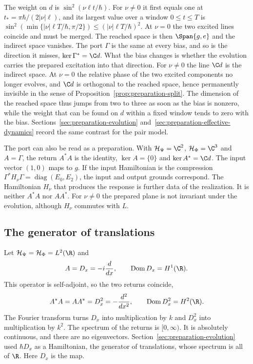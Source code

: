 The weight on $d$ is $\sin^2(\nu\ell t/\hbar)$. For $\nu\ne0$ it first equals one at $t_*=\pi\hbar/(2|\nu|\ell)$, and its largest value over a window $0\le t\le T$ is $\sin^2(\min\{|\nu|\ell T/\hbar,\pi/2\})\le(|\nu|\ell T/\hbar)^2$. At $\nu=0$ the two excited lines coincide and must be merged. The reached space is then $\Span\{g,e\}$ and the indirect space vanishes. The port $\Gamma$ is the same at every bias, and so is the direction it misses, $\ker\Gamma^*=\C d$. What the bias changes is whether the evolution carries the prepared excitation into that direction. For $\nu\ne0$ the line $\C d$ is the indirect space. At $\nu=0$ the relative phase of the two excited components no longer evolves, and $\C d$ is orthogonal to the reached space, hence permanently invisible in the sense of Proposition~\ref{prop:preparation-split}. The dimension of the reached space thus jumps from two to three as soon as the bias is nonzero, while the weight that can be found on $d$ within a fixed window tends to zero with the bias. Sections~\ref{sec:preparation-evolution} and~\ref{sec:preparation-effective-dynamics} record the same contrast for the pair model.

The port can also be read as a preparation. With $\mathcal H_\Psi=\C^2$, $\mathcal H_\Phi=\C^3$ and $A=\Gamma$, the return $A^*A$ is the identity, $\ker A=\{0\}$ and $\ker A^*=\C d$. The input vector $(1,0)$ maps to $g$. If the input Hamiltonian is the compression $\Gamma^*H_\nu\Gamma=\operatorname{diag}(E_0,E_2)$, the input and output grounds correspond. The Hamiltonian $H_\nu$ that produces the response is further data of the realization. It is neither $A^*A$ nor $AA^*$. For $\nu\ne0$ the prepared plane is not invariant under the evolution, although $H_\nu$ commutes with $L$.

\subsection{The generator of translations}
\label{subsec:four-maps-translation}

Let $\mathcal H_\Psi=\mathcal H_\Phi=L^2(\R)$ and
\begin{equation}
 A=D_x=-i\frac{d}{dx},\qquad \operatorname{Dom}D_x=H^1(\R).
 \label{eq:four-maps-translation}
\end{equation}
This operator is self-adjoint, so the two returns coincide,
\begin{equation}
 A^*A=AA^*=D_x^2=-\frac{d^2}{dx^2},\qquad \operatorname{Dom}D_x^2=H^2(\R).
 \label{eq:four-maps-translation-returns}
\end{equation}
The Fourier transform turns $D_x$ into multiplication by $k$ and $D_x^2$ into multiplication by $k^2$. The spectrum of the returns is $[0,\infty)$. It is absolutely continuous, and there are no eigenvectors. Section~\ref{sec:preparation-evolution} used $\hbar D_x$ as a Hamiltonian, the generator of translations, whose spectrum is all of $\R$. Here $D_x$ is the map.

